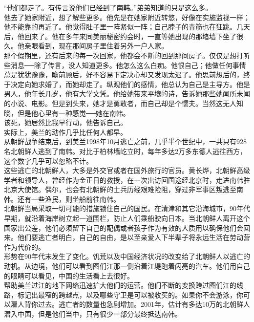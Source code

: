 “他们都走了。有传言说他们已经到了南韩。”弟弟知道的只是这么多。\\

他去了她家附近，想了解些更多。他先是在她家附近转悠，好像在实施监视一样；他不能靠的再近了。他觉得肚子里一阵紧似一阵；自己脖子的青筋也在狂跳。几天后，他回来了。他在多年来同美丽秘密约会时，一直等她出现的那堵墙下坐了很久。他亲眼看到，现在那间房子里住着另外一户人家。\\

那个假期里，还有后来的每一次回家，他都会不断的回到那间房子。仅仅是想打听些消息──除了传言，没人知道更多。他怎么这么白痴。他恨自己；他做任何事情总是犹犹豫豫，瞻前顾后，好不容易下定决心却又发现太迟了。他思前想后的，终于决定向她求婚了，而她却走了。纵观他们的感情，他总认为自己是主导方。他是男人，他年长几岁，他有大学文凭。他给她带来平壤的诗，告诉她那些她闻所未闻的小说、电影。但是到头来，她才是勇敢者，而自己却是个懦夫。当然这无人知晓，但是他心里有一种感觉──她在南韩。\\

该死，她居然比我早行动，他告诉自己。\\

实际上，美兰的动作几乎比任何人都早。\\

从朝鲜战争结束后，到美兰1998年10月逃亡之前，几乎半个世纪中，一共只有928名北朝鲜人逃到了南韩。对比于柏林墙屹立时，每年多达2万多东德人逃往西方，这个数字几乎可以忽略不计。\\

这些逃亡的北朝鲜人，大多是外交官或者在国外旅行的官员。黄长烨，北朝鲜高级学者和领导人，曾经作为金正日的教授，在一次出访回国途经北京时，走进南韩驻北京大使馆。偶尔，也会有北朝鲜的士兵历经艰难险阻，穿过非军事区叛逃至南韩。还有一些渔民，则坐船前往南韩。\\

北朝鲜当局采取一切可能的措施锁住自己的国民。在清津和其它沿海城市，90年代早期，就沿着海岸树立起一道围栏，防止人们乘船驶向日本。当北朝鲜人离开这个国家出公差，他们必须留下自己的配偶或者孩子作为有效的人质用以确保他们会回来。他们要逃亡者明白，自己的自由，是以至亲爱人下半辈子将永远生活在劳动营作为代价的。\\

形势在90年代末发生了变化。饥荒以及中国经济状况的改变给了北朝鲜人以逃亡的动机。从边境，他们可以看到图们江那一侧沿着江堤跑着闪亮的汽车。他们用自己的眼睛可以看见，中国的生活看上去很好。\\

帮助美兰过江的地下网络迅速扩大他们的运营。他们不断的变换跨过图们江的线路，标记出最窄的跨越点，以及哪些守卫是可以被收买的。如果你不会游泳，你可以雇人背你过去。逃亡者的数量也急剧增加。2001年，估计有多达10万的北朝鲜人潜入中国，但是他们当中，只有很少一部分最终抵达南韩。\\

